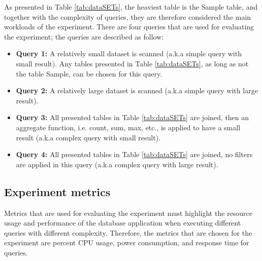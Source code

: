 As presented in Table \ref{tab:dataSETs}, the heaviest table is the Sample table, and together with the complexity of queries, they are therefore considered the main workloads of the experiment. There are four queries that are used for evaluating the experiment; the queries are described as follow:
\begin{itemize}
\item \textbf{Query 1:} A relatively small dataset is scanned (a.k.a simple query with small result). Any tables presented in Table \ref{tab:dataSETs}, as long as not the table Sample, can be chosen for this query.
\item \textbf{Query 2:} A relatively large dataset is scanned (a.k.a simple query with large result). 
\item \textbf{Query 3:} All presented tables in Table \ref{tab:dataSETs} are joined, then an aggregate function, i.e. count, sum, max, etc., is applied to have a small result (a.k.a complex query with small result).
\item \textbf{Query 4:} All presented tables in Table \ref{tab:dataSETs} are joined, no filters are applied in this query (a.k.a complex query with large result).
\end{itemize}
\subsection{Experiment metrics}
Metrics that are used for evaluating the experiment must highlight the resource usage and performance of the database application when executing different queries with different complexity. Therefore, the metrics that are chosen for the experiment are percent CPU usage, power consumption, and response time for queries. 
